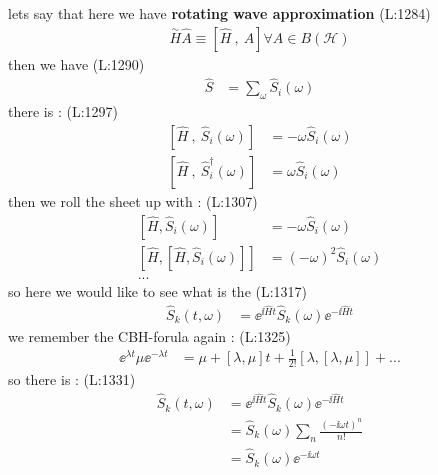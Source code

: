  lets say that
 here we have \textbf{rotating wave approximation}
(L:1284)
\begin{equation}
\begin{split}
\overset{\sim}{H }\hat{A }\equiv \left[\hat{H }\ ,\ A \right]\forall A \in B (\mathcal{H })\end{split}
\end{equation}
 then we have
(L:1290)
\begin{equation}
\begin{split}
\hat{S }&=\sum _{\omega }\hat{S }_{i }(\omega )\end{split}
\end{equation}
 there is : 
(L:1297)
\begin{equation}
\begin{split}
\left[\hat{H }\ ,\ \hat{S }_{i }(\omega )\right]&=-\omega \hat{S }_{i }(\omega )\\
\left[\hat{H }\ ,\ \hat{S }_{i }^\dagger (\omega )\right]&=\omega \hat{S }_{i }(\omega )\end{split}
\end{equation}
 then we roll the sheet up with : 
(L:1307)
\begin{equation}
\begin{split}
\left[\hat{H },\hat{S }_{i }(\omega )\right]&=-\omega \hat{S }_{i }(\omega )\\
\left[\hat{H },[\hat{H },\hat{S }_{i }(\omega )]\right]&=(-\omega )^{2}\hat{S }_{i }(\omega )\\
...\end{split}
\end{equation}
 so here we would like to see what is the 
(L:1317)
\begin{equation}
\begin{split}
\hat{S }_{k }(t ,\omega )&=\ee ^{\ii \hat{H }t }\hat{S }_{k }(\omega )\ee ^{-\ii \hat{H }t }\end{split}
\end{equation}
 we remember the CBH-forula again :
(L:1325)
\begin{equation}
\begin{split}
\ee ^{\lambda t }\mu \ee ^{-\lambda t }&=\mu +[\lambda ,\mu ]t +\frac{1}{2! }[\lambda ,[\lambda ,\mu ]]+...\end{split}
\end{equation}
 so there is : 
(L:1331)
\begin{equation}
\begin{split}
\hat{S }_{k }(t ,\omega )&=\ee ^{\ii \hat{H }t }\hat{S }_{k }(\omega )\ee ^{-\ii \hat{H }t }\\
&=\hat{S }_{k }(\omega )\sum _{n }\frac{(-\ii \omega t )^{n }}{n ! }\\
&=\hat{S }_{k }(\omega )\ee ^{-\ii \omega t }\end{split}
\end{equation}
